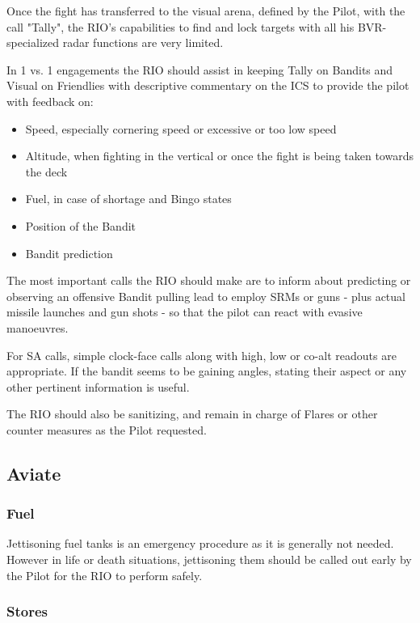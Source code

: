 Once the fight has transferred to the visual arena, defined by the Pilot, with
the call "Tally", the RIO's capabilities to find and lock targets with all his
BVR-specialized radar functions are very limited.

In 1 vs. 1 engagements the RIO should assist in keeping Tally on Bandits and
Visual on Friendlies with descriptive commentary on the ICS to provide the
pilot with feedback on:

\begin{itemize}
 \item Speed, especially cornering speed or excessive or too low speed
 \item Altitude, when fighting in the vertical or once the fight is being taken
   towards the deck
 \item Fuel, in case of shortage and Bingo states
 \item Position of the Bandit
 \item Bandit prediction
\end{itemize}

The most important calls the RIO should make are to inform about predicting or
observing an offensive Bandit pulling lead to employ SRMs or guns - plus actual
missile launches and gun shots - so that the pilot can react with evasive
manoeuvres.

For SA calls, simple clock-face calls along with high, low or co-alt readouts
are appropriate. If the bandit seems to be gaining angles, stating their aspect
or any other pertinent information is useful.

The RIO should also be sanitizing, and remain in charge of Flares or other
counter measures as the Pilot requested.

\newpage

\subsection{Aviate}

\subsubsection*{Fuel}

Jettisoning fuel tanks is an emergency procedure as it is generally not needed.
However in life or death situations, jettisoning them should be called out
early by the Pilot for the RIO to perform safely.

\subsubsection*{Stores}

